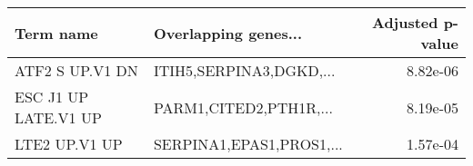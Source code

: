\begin{tabular}{llr}
\toprule
           Term name &     Overlapping genes... &  Adjusted p-value \\
\midrule
     ATF2 S UP.V1 DN &  ITIH5,SERPINA3,DGKD,... &          8.82e-06 \\
ESC J1 UP LATE.V1 UP &   PARM1,CITED2,PTH1R,... &          8.19e-05 \\
       LTE2 UP.V1 UP & SERPINA1,EPAS1,PROS1,... &          1.57e-04 \\
\bottomrule
\end{tabular}
